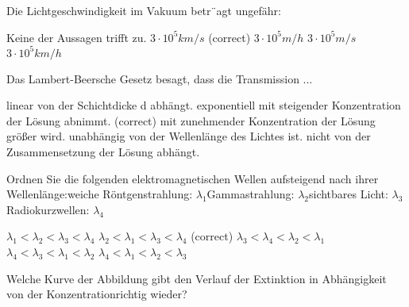 \documentclass[11pt]{exam}
\begin{document}
\setlength{\voffset}{-0.5in}
\setlength{\headsep}{5pt}

\hspace{2mm}
 \hspace{5mm}
\vspace{4mm}

\begin{questions}

\question Die Lichtgeschwindigkeit im Vakuum betr¨agt ungefähr:

\begin{choices}
	\choice Keine der Aussagen trifft zu.
	\choice \( 3 \cdot10^5 km/s \) (correct)
	\choice \( 3 \cdot10^5 m/h \)
	\choice \( 3 \cdot10^5 m/s \)
	\choice \( 3 \cdot10^5 km/h \)
\end{choices}

\vspace{3mm}\question Das Lambert-Beersche Gesetz besagt, dass die Transmission ...

\begin{choices}
	\choice linear von der Schichtdicke d abhängt.
	\choice exponentiell mit steigender Konzentration der Lösung abnimmt. (correct)
	\choice mit zunehmender Konzentration der Lösung größer wird.
	\choice unabhängig von der Wellenlänge des Lichtes ist.
	\choice nicht von der Zusammensetzung der Lösung abhängt.
\end{choices}

\vspace{3mm}\question Ordnen Sie die folgenden elektromagnetischen Wellen aufsteigend nach ihrer Wellenlänge:weiche Röntgenstrahlung: \( \lambda_1 \)Gammastrahlung: \( \lambda_2 \)sichtbares Licht: \( \lambda_3 \)Radiokurzwellen: \( \lambda_4 \)

\begin{choices}
	\choice \( \lambda_1 < \lambda_2 < \lambda_3 < \lambda_4 \)
	\choice \( \lambda_2 < \lambda_1 < \lambda_3 < \lambda_4 \) (correct)
	\choice \( \lambda_3 < \lambda_4 < \lambda_2 < \lambda_1 \)
	\choice \( \lambda_4 < \lambda_3 < \lambda_1 < \lambda_2 \)
	\choice \( \lambda_4 < \lambda_1 < \lambda_2 < \lambda_3 \)
\end{choices}

\vspace{3mm}\question Welche Kurve der Abbildung gibt den Verlauf der Extinktion in Abhängigkeit von der Konzentrationrichtig wieder?


\end{questions}
\end{document}
